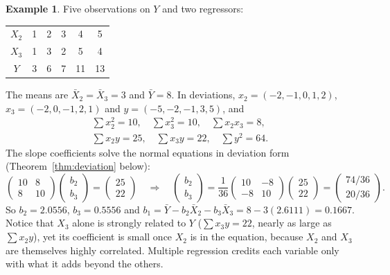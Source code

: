 \documentclass[11pt,a4paper]{article}
\numberwithin{equation}{section}
\theoremstyle{definition}
\newtheorem{exa}[thm]{Example}
\begin{document}
\begin{exa}
\label{ex:hand3}
Five observations on $Y$ and two regressors:
\begin{center}
\begin{tabular}{c|ccccc}
$X_2$ & 1 & 2 & 3 & 4 & 5\\
$X_3$ & 1 & 3 & 2 & 5 & 4\\
$Y$ & 3 & 6 & 7 & 11 & 13
\end{tabular}
\end{center}
The means are $\bar X_2 = \bar X_3 = 3$ and $\bar Y = 8$. In deviations, $x_2 = (-2, -1, 0, 1, 2)$, $x_3 = (-2, 0, -1, 2, 1)$ and $y = (-5, -2, -1, 3, 5)$, and
\begin{gather*}
\sum x_2^2 = 10, \quad \sum x_3^2 = 10, \quad \sum x_2x_3 = 8,\\
\sum x_2y = 25, \quad \sum x_3y = 22, \quad \sum y^2 = 64 .
\end{gather*}
The slope coefficients solve the normal equations in deviation form (Theorem~\ref{thm:deviation} below):
\[
\begin{pmatrix} 10 & 8 \\ 8 & 10 \end{pmatrix}\begin{pmatrix} b_2 \\ b_3 \end{pmatrix} = \begin{pmatrix} 25 \\ 22 \end{pmatrix}
\quad\Longrightarrow\quad
\begin{pmatrix} b_2 \\ b_3 \end{pmatrix} = \frac{1}{36}\begin{pmatrix} 10 & -8 \\ -8 & 10 \end{pmatrix}\begin{pmatrix} 25 \\ 22 \end{pmatrix}
= \begin{pmatrix} 74/36 \\ 20/36 \end{pmatrix} .
\]
So $b_2 = 2.0556$, $b_3 = 0.5556$ and $b_1 = \bar Y - b_2\bar X_2 - b_3\bar X_3 = 8 - 3(2.6111) = 0.1667$. Notice that $X_3$ alone is strongly related to $Y$
($\sum x_3y = 22$, nearly as large as $\sum x_2y$), yet its coefficient is small once $X_2$ is in the equation, because $X_2$ and $X_3$ are themselves
highly correlated. Multiple regression credits each variable only with what it adds beyond the others.
\end{exa}
\end{document}
